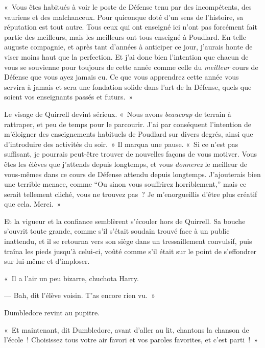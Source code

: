 «~Vous êtes habitués à voir le poste de Défense tenu par des incompétents, des vauriens et des malchanceux.
Pour quiconque doté d'un sens de l'histoire, sa réputation est tout autre.
Tous ceux qui ont enseigné ici n'ont pas forcément fait partie des meilleurs, mais les meilleurs ont tous enseigné à Poudlard.
En telle auguste compagnie, et après tant d'années à anticiper ce jour, j'aurais honte de viser moins haut que la perfection.
Et j'ai donc bien l'intention que chacun de vous se souvienne pour toujours de cette année comme celle du \emph{meilleur} cours de Défense que vous ayez jamais eu.
Ce que vous apprendrez cette année vous servira à jamais et sera une fondation solide dans l'art de la Défense, quels que soient vos enseignants passés et futurs.~»

Le visage de Quirrell devint sérieux.
«~Nous avons \emph{beaucoup} de terrain à rattraper, et peu de temps pour le parcourir.
J'ai par conséquent l'intention de m'éloigner des enseignements habituels de Poudlard sur divers degrés, ainsi que d'introduire des activités du soir.~» 
Il marqua une pause.
«~Si ce n'est pas suffisant, je pourrais peut-être trouver de nouvelles façons de vous motiver.
Vous êtes les élèves que j'attends depuis longtemps, et vous \emph{donnerez} le meilleur de vous-mêmes dans ce cours de Défense attendu depuis longtemps.
J'ajouterais bien une terrible menace, comme “Ou sinon vous souffrirez horriblement,” mais ce serait tellement cliché, vous ne trouvez pas~?
Je m'enorgueillis d'être plus créatif que cela. Merci.~»

Et la vigueur et la confiance semblèrent s'écouler hors de Quirrell.
Sa bouche s'ouvrit toute grande, comme s'il s'était soudain trouvé face à un public inattendu, et il se retourna vers son siège dans un tressaillement convulsif, puis traîna les pieds jusqu'à celui-ci, voûté comme s'il était sur le point de s'effondrer sur lui-même et d'imploser.

«~Il a l'air un peu bizarre, chuchota Harry.

--- Bah, dit l'élève voisin. T'as encore rien vu.~»

Dumbledore revint au pupitre.

«~Et maintenant, dit Dumbledore, avant d'aller au lit, chantons la chanson de l'école~!
Choisissez tous votre air favori et vos paroles favorites, et c'est parti~!~»

